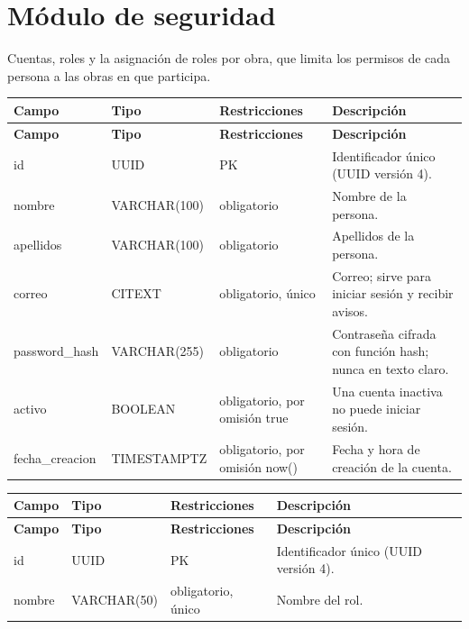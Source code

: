 \section{Módulo de seguridad}
Cuentas, roles y la asignación de roles por obra, que limita los permisos de cada persona a las obras en que participa.

\begin{xltabular}{\linewidth}{@{}>{\ttfamily\footnotesize}p{4.9cm}>{\ttfamily\footnotesize}p{2.4cm}>{\raggedright\arraybackslash\footnotesize}p{3.3cm}>{\footnotesize}X@{}}
\toprule\normalfont\sffamily\bfseries\footnotesize Campo & \normalfont\sffamily\bfseries\footnotesize Tipo & \sffamily\bfseries Restricciones & \sffamily\bfseries Descripción\\\midrule\endfirsthead
\toprule\normalfont\sffamily\bfseries\footnotesize Campo & \normalfont\sffamily\bfseries\footnotesize Tipo & \sffamily\bfseries Restricciones & \sffamily\bfseries Descripción\\\midrule\endhead
\bottomrule\endfoot
id & UUID & PK & Identificador único (UUID versión 4).\\
nombre & VARCHAR(100) & obligatorio & Nombre de la persona.\\
apellidos & VARCHAR(100) & obligatorio & Apellidos de la persona.\\
correo & CITEXT & obligatorio, único & Correo; sirve para iniciar sesión y recibir avisos.\\
password\_hash & VARCHAR(255) & obligatorio & Contraseña cifrada con función hash; nunca en texto claro.\\
activo & BOOLEAN & obligatorio, por omisión true & Una cuenta inactiva no puede iniciar sesión.\\
fecha\_creacion & TIMESTAMPTZ & obligatorio, por omisión now() & Fecha y hora de creación de la cuenta.\\
\end{xltabular}

\begin{xltabular}{\linewidth}{@{}>{\ttfamily\footnotesize}p{4.9cm}>{\ttfamily\footnotesize}p{2.4cm}>{\raggedright\arraybackslash\footnotesize}p{3.3cm}>{\footnotesize}X@{}}
\toprule\normalfont\sffamily\bfseries\footnotesize Campo & \normalfont\sffamily\bfseries\footnotesize Tipo & \sffamily\bfseries Restricciones & \sffamily\bfseries Descripción\\\midrule\endfirsthead
\toprule\normalfont\sffamily\bfseries\footnotesize Campo & \normalfont\sffamily\bfseries\footnotesize Tipo & \sffamily\bfseries Restricciones & \sffamily\bfseries Descripción\\\midrule\endhead
\bottomrule\endfoot
id & UUID & PK & Identificador único (UUID versión 4).\\
nombre & VARCHAR(50) & obligatorio, único & Nombre del rol.\\
\end{xltabular}

